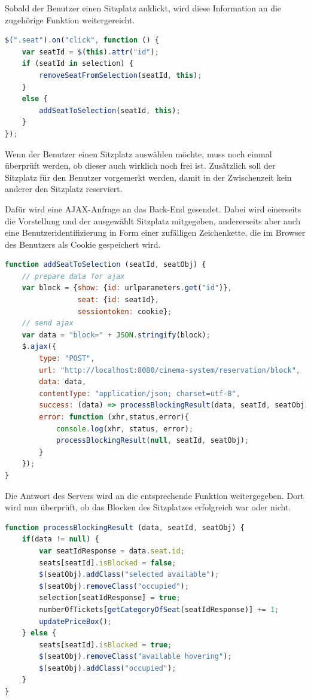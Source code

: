 Sobald der Benutzer einen Sitzplatz anklickt, wird diese Information an die zugehörige Funktion weitergereicht.

\begin{lstlisting}[language=JavaScript, caption={Erkennen des Anklickens eines Sitzplatzes}, label={lst:js_onclick}]
$(".seat").on("click", function () {
	var seatId = $(this).attr("id");
	if (seatId in selection) {
		removeSeatFromSelection(seatId, this);
	}
	else {
		addSeatToSelection(seatId, this);
	}
});
\end{lstlisting}

Wenn der Benutzer einen Sitzplatz auswählen möchte, muss noch einmal überprüft werden, ob dieser auch wirklich noch frei ist.
Zusätzlich soll der Sitzplatz für den Benutzer vorgemerkt werden, damit in der Zwischenzeit kein anderer den Sitzplatz reserviert.

Dafür wird eine \acs{AJAX}-Anfrage an das Back-End gesendet.
Dabei wird einerseits die Vorstellung und der ausgewählt Sitzplatz mitgegeben, andererseits aber auch eine Benutzeridentifizierung in Form einer zufälligen Zeichenkette, die im Browser des Benutzers als Cookie gespeichert wird.

\begin{lstlisting}[language=JavaScript, caption={Senden einer Anfrage, den Sitzplatz zu blocken}, label={lst:js_ajax_send_block}]
function addSeatToSelection (seatId, seatObj) {
	// prepare data for ajax
	var block = {show: {id: urlparameters.get("id")},
	             seat: {id: seatId},
	             sessiontoken: cookie};
	// send ajax
	var data = "block=" + JSON.stringify(block);
	$.ajax({
		type: "POST",
		url: "http://localhost:8080/cinema-system/reservation/block",
		data: data,
		contentType: "application/json; charset=utf-8",
		success: (data) => processBlockingResult(data, seatId, seatObj),
		error: function (xhr,status,error){
			console.log(xhr, status, error);
			processBlockingResult(null, seatId, seatObj);
		}
	});
}
\end{lstlisting}

Die Antwort des Servers wird an die entsprechende Funktion weitergegeben.
Dort wird nun überprüft, ob das Blocken des Sitzplatzes erfolgreich war oder nicht.

\begin{lstlisting}[language=JavaScript, caption={Verarbeiten der Server-Antwort beim Versuch, einen Platz zu blocken}, label={lst:js_ajax_process_block}]
function processBlockingResult (data, seatId, seatObj) {
	if(data != null) {
		var seatIdResponse = data.seat.id;
		seats[seatId].isBlocked = false;
		$(seatObj).addClass("selected available");
		$(seatObj).removeClass("occupied");
		selection[seatIdResponse] = true;
		numberOfTickets[getCategoryOfSeat(seatIdResponse)] += 1;
		updatePriceBox();
	} else {
		seats[seatId].isBlocked = true;
		$(seatObj).removeClass("available hovering");
		$(seatObj).addClass("occupied");
	}
}
\end{lstlisting}

